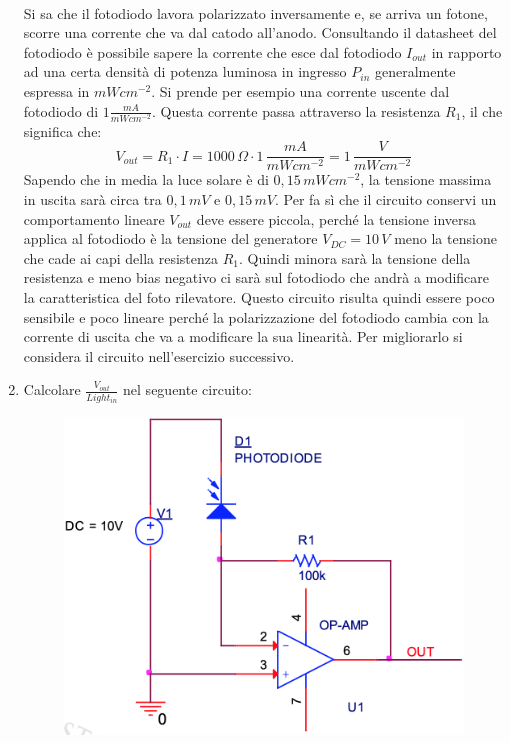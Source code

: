 \documentclass[12pt, a4paper]{report}
\begin{document}
\begin{appendices}
\begin{enumerate}
    \\Si sa che il fotodiodo lavora polarizzato inversamente e, se arriva un fotone, scorre una corrente che va dal catodo all'anodo. Consultando il datasheet del fotodiodo è possibile sapere la corrente che esce dal fotodiodo $I_{out}$ in rapporto ad una certa densità di potenza luminosa in ingresso $P_{in}$ generalmente espressa in $mWcm^{-2}$. Si prende per esempio una corrente uscente dal fotodiodo di $1 \frac{mA}{mWcm^{-2}}$. Questa corrente passa attraverso la resistenza $R_1$, il che significa che:
    \begin{equation*}
        V_{out} = R_1 \cdot I = 1000\,\Omega \cdot 1\,\frac{mA}{mWcm^{-2}} = 1\,\frac{V}{mWcm^{-2}}
    \end{equation*}
    Sapendo che in media la luce solare è di $0,15\,mWcm^{-2}$, la tensione massima in uscita sarà circa tra $0,1\,mV$ e $0,15\,mV$. Per fa sì che il circuito conservi un comportamento lineare $V_{out}$ deve essere piccola, perché la tensione inversa applica al fotodiodo è la tensione del generatore $V_{DC} = 10\,V$ meno la tensione che cade ai capi della resistenza $R_1$. Quindi minora sarà la tensione della resistenza e meno bias negativo ci sarà sul fotodiodo che andrà a modificare la caratteristica del foto rilevatore. Questo circuito risulta quindi essere poco sensibile e poco lineare perché la polarizzazione del fotodiodo cambia con la corrente di uscita che va a modificare la sua linearità. Per migliorarlo si considera il circuito nell'esercizio successivo.
    \item Calcolare $\frac{V_{out}}{Light_{in}}$ nel seguente circuito:
    \begin{figure}[h]
        \centering
       \includegraphics[scale=0.3,angle=0]{diodi_es3.png}

\end{figure}
\end{enumerate}
\end{appendices}
\end{document}
